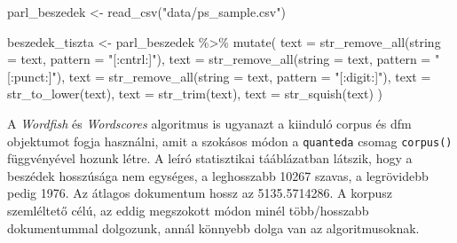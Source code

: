 \documentclass[
]{book}
\newenvironment{Shaded}{\begin{snugshade}}{\end{snugshade}}
\newcommand{\AttributeTok}[1]{\textcolor[rgb]{0.77,0.63,0.00}{#1}}
\newcommand{\FunctionTok}[1]{\textcolor[rgb]{0.00,0.00,0.00}{#1}}
\newcommand{\NormalTok}[1]{#1}
\newcommand{\OtherTok}[1]{\textcolor[rgb]{0.56,0.35,0.01}{#1}}
\newcommand{\SpecialCharTok}[1]{\textcolor[rgb]{0.00,0.00,0.00}{#1}}
\newcommand{\StringTok}[1]{\textcolor[rgb]{0.31,0.60,0.02}{#1}}
\begin{document}
\begin{Shaded}
\begin{Highlighting}[]
\NormalTok{parl\_beszedek }\OtherTok{\textless{}{-}} \FunctionTok{read\_csv}\NormalTok{(}\StringTok{"data/ps\_sample.csv"}\NormalTok{)}

\NormalTok{beszedek\_tiszta }\OtherTok{\textless{}{-}}\NormalTok{ parl\_beszedek }\SpecialCharTok{\%\textgreater{}\%}
  \FunctionTok{mutate}\NormalTok{(}
    \AttributeTok{text =} \FunctionTok{str\_remove\_all}\NormalTok{(}\AttributeTok{string =}\NormalTok{ text, }\AttributeTok{pattern =} \StringTok{"[:cntrl:]"}\NormalTok{),}
    \AttributeTok{text =} \FunctionTok{str\_remove\_all}\NormalTok{(}\AttributeTok{string =}\NormalTok{ text, }\AttributeTok{pattern =} \StringTok{"[:punct:]"}\NormalTok{),}
    \AttributeTok{text =} \FunctionTok{str\_remove\_all}\NormalTok{(}\AttributeTok{string =}\NormalTok{ text, }\AttributeTok{pattern =} \StringTok{"[:digit:]"}\NormalTok{),}
    \AttributeTok{text =} \FunctionTok{str\_to\_lower}\NormalTok{(text),}
    \AttributeTok{text =} \FunctionTok{str\_trim}\NormalTok{(text),}
    \AttributeTok{text =} \FunctionTok{str\_squish}\NormalTok{(text)}
\NormalTok{  )}
\end{Highlighting}
\end{Shaded}

A \emph{Wordfish} és \emph{Wordscores} algoritmus is ugyanazt a kiinduló
corpus és dfm objektumot fogja használni, amit a szokásos módon a
\texttt{quanteda} csomag \texttt{corpus()} függvényével hozunk létre. A
leíró statisztikai tááblázatban látszik, hogy a beszédek hosszúsága nem
egységes, a leghosszabb 10267 szavas, a legrövidebb pedig 1976. Az
átlagos dokumentum hossz az 5135.5714286. A korpusz szemléltető célú, az
eddig megszokott módon minél több/hosszabb dokumentummal dolgozunk,
annál könnyebb dolga van az algoritmusoknak.
\end{document}
